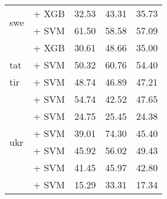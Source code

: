 \begin{longtable}{llccc}
    \midrule
    \multirow{2}{*}{swe}               & \citep{wang2024multilingual} + XGB                                 & 32.53                                & 43.31              & 35.73             \\
                                       & \citep{wang2024multilingual} + SVM                                 & 61.50                                & 58.58              & 57.09             \\
                                       & \citep{kummervold-etal-2021-operationalizing} + XGB                & 30.61                                & 48.66              & 35.00             \\
    \midrule
    tat                                & \citep{wang2024multilingual} + SVM                                 & 50.32                                & 60.76              & 54.40             \\
    \midrule
    tir                                & \citep{wang2024multilingual} + SVM                                 & 48.74                                & 46.89              & 47.21             \\
    \midrule
    \multirow{6}{*}{ukr}               & \citep{wang2024multilingual} + SVM                                 & 54.74                                & 42.52              & 47.65             \\
                                       & \citep{schweter2020electraukrainian} + SVM                         & 24.75                                & 25.45              & 24.38             \\
                                       & \citep{snegirev2025russianfocusedembeddersexplorationrumteb} + SVM & 39.01                                & 74.30              & 45.40             \\
                                       & \citep{sturua2024jinaembeddingsv3multilingualembeddingstask} + SVM & 45.92                                & 56.02              & 49.43             \\
                                       & \citep{laba-etal-2023-contextual} + SVM                            & 41.45                                & 45.97              & 42.80             \\
                                       & \citep{minixhofer2023robertaukraine} + SVM                         & 15.29                                & 33.31              & 17.34             \\
    \midrule

\end{longtable}
